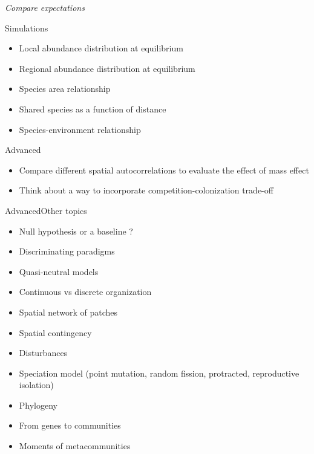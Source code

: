 \documentclass[10pt,aspectratio=149]{beamer}
\begin{document}

{
\usebackgroundtemplate{}
\begin{frame}

	\pagecolor{BDQC1st}
	\color{white}

	\LARGE{\textit{Compare expectations}}

\end{frame}
}


\begin{frame}{Simulations}

    \begin{itemize}
        \item Local abundance distribution at equilibrium 
        \item Regional abundance distribution at equilibrium
        \item Species area relationship
        \item Shared species as a function of distance 
        \item Species-environment relationship
    \end{itemize}

\end{frame}


\begin{frame}{Advanced}

    \begin{itemize}
        \item Compare different spatial autocorrelations to evaluate the effect of mass effect
        \item Think about a way to incorporate competition-colonization trade-off
    \end{itemize}

\end{frame}


\begin{frame}{Advanced}{Other topics}

    \begin{itemize}
        \item Null hypothesis or a baseline ?
        \item Discriminating paradigms
        \item Quasi-neutral models
        \item Continuous vs discrete organization
        \item Spatial network of patches
        \item Spatial contingency
        \item Disturbances
        \item Speciation model (point mutation, random fission, protracted, reproductive isolation)
        \item Phylogeny
        \item From genes to communities
        \item Moments of metacommunities
    \end{itemize}

\end{frame}

\end{document}
